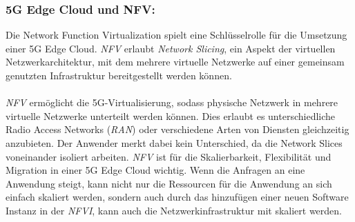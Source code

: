 \documentclass[runningheads]{llncs}
\numberwithin{figure}{section}
\begin{document}
\subsubsection{5G Edge Cloud und NFV:}
Die Network Function Virtualization spielt eine Schlüsselrolle für die Umsetzung einer 5G Edge Cloud.
\textit{NFV} erlaubt \textit{Network Slicing}, ein Aspekt der virtuellen Netzwerkarchitektur, 
mit dem mehrere virtuelle Netzwerke auf einer gemeinsam genutzten Infrastruktur bereitgestellt werden können.
\\
\\
\textit{NFV} ermöglicht die 5G-Virtualisierung, sodass physische Netzwerk in mehrere virtuelle Netzwerke unterteilt werden können. 
Dies erlaubt es unterschiedliche Radio Access Networks (\textit{RAN}) 
oder verschiedene Arten von Diensten gleichzeitig anzubieten. Der Anwender merkt dabei kein Unterschied, da die Network Slices
voneinander isoliert arbeiten. 
\textit{NFV} ist für die Skalierbarkeit, Flexibilität und Migration in einer 5G Edge Cloud wichtig. Wenn die Anfragen an eine
Anwendung steigt, kann nicht nur die Ressourcen für die Anwendung an sich einfach skaliert werden, sondern auch durch das hinzufügen einer neuen
Software Instanz in der \textit{NFVI}, kann auch die Netzwerkinfrastruktur mit skaliert werden. \cite{How5GNFV} 
\end{document}
